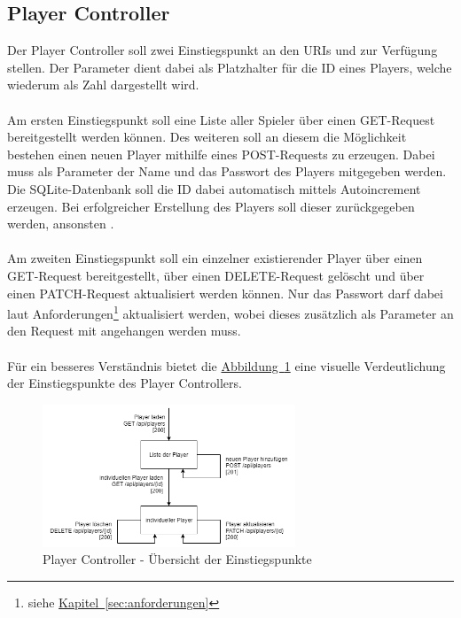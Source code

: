 \subsection{Player Controller}\label{sec:playerController}
Der Player Controller soll zwei Einstiegspunkt an den \glspl{URI}  und  zur Verfügung stellen. Der Parameter  dient dabei als Platzhalter für die ID eines Players, welche wiederum als Zahl dargestellt wird.\\
\\
Am ersten Einstiegspunkt soll eine Liste aller Spieler über einen GET-Request bereitgestellt werden können. Des weiteren soll an diesem die Möglichkeit bestehen einen neuen Player mithilfe eines POST-Requests zu erzeugen. Dabei muss als Parameter der Name und das Passwort des Players mitgegeben werden. Die SQLite-Datenbank soll die ID dabei automatisch mittels Autoincrement erzeugen. Bei erfolgreicher Erstellung des Players soll dieser zurückgegeben werden, ansonsten .\\
\\
Am zweiten Einstiegspunkt soll ein einzelner existierender Player über einen GET-Request bereitgestellt, über einen DELETE-Request gelöscht und über einen PATCH-Request aktualisiert werden können. Nur das Passwort darf dabei laut Anforderungen\footnote{siehe \hyperref[sec:anforderungen]{Kapitel~\ref{sec:anforderungen}}} aktualisiert werden, wobei dieses zusätzlich als Parameter an den Request mit angehangen werden muss.\\
\\
Für ein besseres Verständnis bietet die \hyperref[fig:playerController]{Abbildung~\ref{fig:playerController}} eine visuelle Verdeutlichung der Einstiegspunkte des Player Controllers.
\begin{figure}[htb]
	\includegraphics[width=0.672\textwidth]{images/player-controller.png}
	\caption{Player Controller - Übersicht der Einstiegspunkte}
	\label{fig:playerController}
\end{figure}

